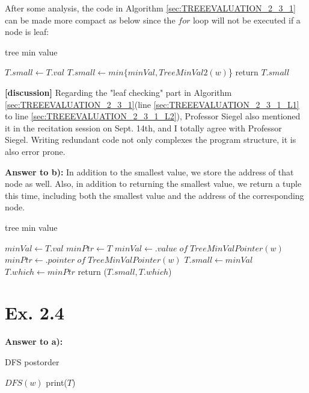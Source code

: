\documentclass[a4paper,11pt]{article}
\theoremstyle{mytheor}
\begin{document}
After some analysis, the code in Algorithm \ref{sec:TREEEVALUATION_2_3_1} can be made more compact as below since the $for$ loop will not be executed if a node is leaf:

\begin{algorithm}[H]
\caption{tree min value}\label{sec:TREEEVALUATION_2_3_2}
\begin{algorithmic}[1]
  \State $T.small \gets T.val$
    \State $T.small \gets min\{minVal, TreeMinVal2(w)$\}
  \EndFor
  \State return $T.small$
\EndFunction
\end{algorithmic}
\end{algorithm}
\textbf{[discussion]} Regarding the "leaf checking" part in Algorithm \ref{sec:TREEEVALUATION_2_3_1}(line \ref{sec:TREEEVALUATION_2_3_1_L1} to line \ref{sec:TREEEVALUATION_2_3_1_L2}), Professor Siegel also mentioned it in the recitation session on Sept. 14th, and I totally agree with Professor Siegel. Writing redundant code not only complexes the program structure, it is also error prone.

\vspace{1.2in}


\noindent\textbf{Answer to b):} In addition to the smallest value, we store the address of that node as well. Also, in addition to returning the smallest value, we return a tuple this time, including both the smallest value and the address of the corresponding node.

\begin{algorithm}[H]
\caption{tree min value}\label{sec:TREEEVALUATION_2_3_b}
\begin{algorithmic}[1]
  \State $minVal \gets T.val$
  \State $minPtr \gets T$
      \State $minVal \gets .value\;of\;TreeMinValPointer(w)$
      \State $minPtr \gets .pointer\;of\;TreeMinValPointer(w)$
    \EndIf
  \EndFor
  \State $T.small \gets minVal$
  \State $T.which \gets minPtr$
  \State return ($T.small, T.which$)   
\EndFunction
\end{algorithmic}
\end{algorithm}

\vspace{1.2in}

\section*{Ex. 2.4}
\noindent\textbf{Answer to a):} 
\begin{algorithm}[H]
\caption{DFS postorder}\label{sec:TREEEVALUATION_2_4_a}
\begin{algorithmic}[1]
    \State $DFS(w)$
  \EndFor
  \State print($T$)
\EndProcedure
\end{algorithmic}
\end{algorithm}
\end{document}
